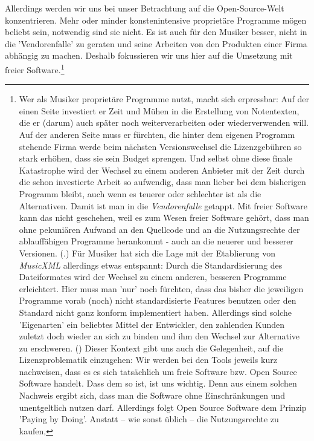 Allerdings werden wir uns bei unser Betrachtung auf die Open-Source-Welt
konzentrieren. Mehr oder minder konstenintensive proprietäre Programme mögen
beliebt sein, notwendig sind sie nicht. Es ist auch für den Musiker besser,
nicht in die 'Vendorenfalle' zu geraten und seine Arbeiten von den Produkten
einer Firma abhängig zu machen. Deshalb fokussieren wir uns hier auf die
Umsetzung mit freier Software.\footnote{Wer als Musiker proprietäre Programme
nutzt, macht sich erpressbar: Auf der einen Seite investiert er Zeit und Mühen
in die Erstellung von Notentexten, die er (darum) auch später noch
weiterverarbeiten oder wiederverwenden will. Auf der anderen Seite muss er
fürchten, die hinter dem eigenen Programm stehende Firma werde beim nächsten
Versionswechsel die Lizenzgebühren so stark erhöhen, dass sie sein Budget
sprengen. Und selbst ohne diese finale Katastrophe wird der Wechsel zu einem
anderen Anbieter mit der Zeit durch die schon investierte Arbeit so aufwendig,
dass man lieber bei dem bisherigen Programm bleibt, auch wenn es teuerer oder
schlechter ist als die Alternativen. Damit ist man in die \textit{Vendorenfalle}
getappt. Mit freier Software kann das nicht geschehen, weil es zum Wesen freier
Software gehört, dass man ohne pekuniären Aufwand an den Quellcode und an die
Nutzungsrechte der ablauffähigen Programme herankommt - auch an die neuerer und
besserer Versionen. (\cite[vgl. dazu][\nopage wp.]{FSF2018a}.) Für Musiker hat
sich die Lage mit der Etablierung von \textit{MusicXML} allerdings etwas
entspannt: Durch die Standardisierung des Dateiformates wird der Wechsel zu
einem anderen, besseren Programme erleichtert. Hier muss man 'nur' noch
fürchten, dass das bisher die jeweiligen Programme vorab (noch) nicht
standardisierte Features benutzen oder den Standard nicht ganz konform
implementiert haben. Allerdings sind solche 'Eigenarten' ein beliebtes Mittel
der Entwickler, den zahlenden Kunden zuletzt doch wieder an sich zu binden und
ihm den Wechsel zur Alternative zu erschweren. (\cite[Zur Lizenzierung von
MusicXML vgl. auch][\nopage wp.]{WpedMusicXML2018a}) Dieser Kontext gibt uns
auch die Gelegenheit, auf die Lizenzproblematik einzugehen: Wir werden bei den
Tools jeweils kurz nachweisen, dass es es sich tatsächlich um freie Software
bzw. Open Source Software handelt. Dass dem so ist, ist uns wichtig. Denn aus
einem solchen Nachweis ergibt sich, dass man die Software ohne Einschränkungen
und unentgeltlich nutzen darf. Allerdings folgt Open Source Software dem Prinzip
'Paying by Doing'. Anstatt -- wie sonst üblich -- die Nutzungsrechte zu kaufen,
}
